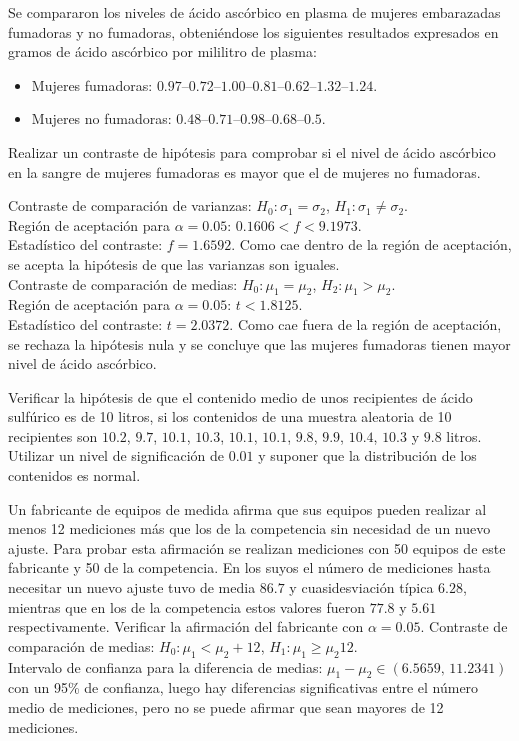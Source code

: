 {Se compararon los niveles de ácido ascórbico en plasma de mujeres embarazadas fumadoras y no fumadoras,
obteniéndose los siguientes resultados expresados en gramos de ácido ascórbico por mililitro de plasma:
\begin{itemize}
\item[] Mujeres fumadoras: $0.97$--$0.72$--$1.00$--$0.81$--$0.62$--$1.32$--$1.24$.
\item[] Mujeres no fumadoras: $0.48$--$0.71$--$0.98$--$0.68$--$0.5$.
\end{itemize}
Realizar un contraste de hipótesis para comprobar si el nivel de ácido ascórbico en la sangre de mujeres fumadoras es
mayor que el de mujeres no fumadoras.
}
{Contraste de comparación de varianzas: $H_0:\sigma_1=\sigma_2$, $H_1:\sigma_1\neq \sigma_2$.\\
Región de aceptación para $\alpha=0.05$: $0.1606<f<9.1973$.\\
Estadístico del contraste: $f=1.6592$. Como cae dentro de la región de aceptación, se acepta la hipótesis de que las
varianzas son iguales.\\
Contraste de comparación de medias: $H_0:\mu_1=\mu_2$, $H_2:\mu_1>\mu_2$.\\
Región de aceptación para $\alpha=0.05$: $t<1.8125$.\\
Estadístico del contraste: $t=2.0372$. Como cae fuera de la región de aceptación, se rechaza la hipótesis nula y se
concluye que las mujeres fumadoras tienen mayor nivel de ácido ascórbico. 
}
{}


{Verificar la hipótesis de que el contenido medio de unos recipientes de ácido sulfúrico es de 10 litros, si los
contenidos de una muestra aleatoria de 10 recipientes son $10.2$, $9.7$, $10.1$, $10.3$, $10.1$, $10.1$, $9.8$, $9.9$,
$10.4$, $10.3$ y $9.8$ litros.
Utilizar un nivel de significación de $0.01$ y suponer que la distribución de los contenidos es normal.
}
{}
{}


{Un fabricante de equipos de medida afirma que sus equipos pueden realizar al menos 12 mediciones más que los de la
competencia sin necesidad de un nuevo ajuste.
Para probar esta afirmación se realizan mediciones con 50 equipos de este fabricante y 50 de la competencia.
En los suyos el número de mediciones hasta necesitar un nuevo ajuste tuvo de media $86.7$ y cuasidesviación típica
$6.28$, mientras que en los de la competencia estos valores fueron $77.8$ y $5.61$ respectivamente.
Verificar la afirmación del fabricante con $\alpha=0.05$.
}
{
Contraste de comparación de medias: $H_0:\mu_1<\mu_2+12$, $H_1:\mu_1\geq\mu_2 12$.\\
Intervalo de confianza para la diferencia de medias: $\mu_1-\mu_2\in (6.5659,\,11.2341)$ con un 95\% de confianza,
luego hay diferencias significativas entre el número medio de mediciones, pero no se puede afirmar que sean mayores de
12 mediciones.
}
{}


